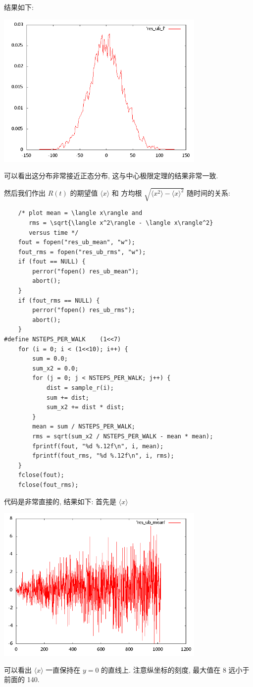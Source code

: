 \documentclass{ctexart}
\begin{document}
结果如下:
\begin{center}
\includegraphics[width=4in]{plot_ub_f.png}
\end{center}
可以看出这分布非常接近正态分布, 这与中心极限定理的结果非常一致.

然后我们作出 $R(t)$ 的期望值 $\langle x\rangle$ 和
方均根 $\sqrt{\langle x^2\rangle-\langle x\rangle^2}$
随时间的关系:
\begin{verbatim}
    /* plot mean = \langle x\rangle and
       rms = \sqrt{\langle x^2\rangle - \langle x\rangle^2}
       versus time */
    fout = fopen("res_ub_mean", "w");
    fout_rms = fopen("res_ub_rms", "w");
    if (fout == NULL) {
        perror("fopen() res_ub_mean");
        abort();
    }
    if (fout_rms == NULL) {
        perror("fopen() res_ub_rms");
        abort();
    }
#define NSTEPS_PER_WALK    (1<<7)
    for (i = 0; i < (1<<10); i++) {
        sum = 0.0;
        sum_x2 = 0.0;
        for (j = 0; j < NSTEPS_PER_WALK; j++) {
            dist = sample_r(i);
            sum += dist;
            sum_x2 += dist * dist;
        }
        mean = sum / NSTEPS_PER_WALK;
        rms = sqrt(sum_x2 / NSTEPS_PER_WALK - mean * mean);
        fprintf(fout, "%d %.12f\n", i, mean);
        fprintf(fout_rms, "%d %.12f\n", i, rms);
    }
    fclose(fout);
    fclose(fout_rms);
\end{verbatim}
代码是非常直接的, 结果如下: 首先是 $\langle x\rangle$
\begin{center}
\includegraphics[width=4in]{plot_ub_mean.png}
\end{center}
可以看出 $\langle x\rangle$ 一直保持在 $y=0$ 的直线上.
注意纵坐标的刻度, 最大值在 8 远小于前面的 140.
\end{document}
